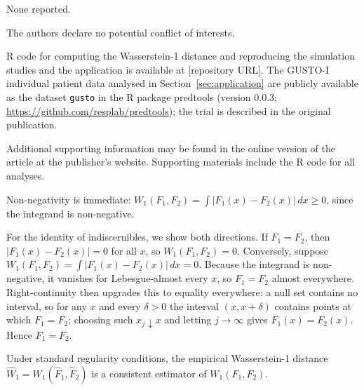 \documentclass[AMA,Times1COL]{WileyNJDv5}
\begin{document}
None reported.


The authors declare no potential conflict of interests.


R code for computing the Wasserstein-1 distance and reproducing the simulation studies and the application is available at [repository URL]. The GUSTO-I individual patient data analysed in Section~\ref{sec:application} are publicly available as the dataset \texttt{gusto} in the R package predtools (version 0.0.3; \url{https://github.com/resplab/predtools}); the trial is described in the original publication.\cite{gusto1993}




Additional supporting information may be found in the online version of the article at the publisher's website. Supporting materials include the R code for all analyses.

\appendix



Non-negativity is immediate: $W_1(F_1, F_2) = \int |F_1(x) - F_2(x)| \, dx \geq 0$, since the integrand is non-negative.

For the identity of indiscernibles, we show both directions. If $F_1 = F_2$, then $|F_1(x) - F_2(x)| = 0$ for all $x$, so $W_1(F_1, F_2) = 0$. Conversely, suppose $W_1(F_1, F_2) = \int |F_1(x) - F_2(x)| \, dx = 0$. Because the integrand is non-negative, it vanishes for Lebesgue-almost every $x$, so $F_1 = F_2$ almost everywhere. Right-continuity then upgrades this to equality everywhere: a null set contains no interval, so for any $x$ and every $\delta > 0$ the interval $(x, x + \delta)$ contains points at which $F_1 = F_2$; choosing such $x_j \downarrow x$ and letting $j \to \infty$ gives $F_1(x) = F_2(x)$. Hence $F_1 = F_2$.


Under standard regularity conditions, the empirical Wasserstein-1 distance $\widehat{W}_1 = W_1(\hat{F}_1, \hat{F}_2)$ is a consistent estimator of $W_1(F_1, F_2)$.\cite{delbarrio1999}
\end{document}
